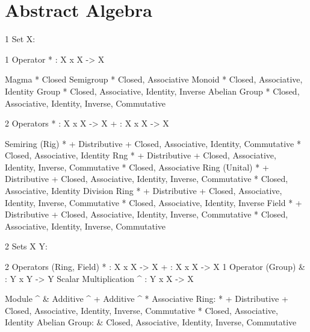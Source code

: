 \part{Abstract Algebra}\label{part:abstract_algebra}

\iffalse

1 Set X:

  1 Operator
  * : X x X -> X

    Magma         * Closed
    Semigroup     * Closed, Associative
    Monoid        * Closed, Associative, Identity
    Group         * Closed, Associative, Identity, Inverse
    Abelian Group * Closed, Associative, Identity, Inverse, Commutative

  2 Operators
  * : X x X -> X
  + : X x X -> X

    Semiring (Rig) * + Distributive
                     + Closed, Associative, Identity, Commutative
                     * Closed, Associative, Identity
    Rng            * + Distributive
                     + Closed, Associative, Identity, Inverse, Commutative
                     * Closed, Associative
    Ring (Unital)  * + Distributive
                     + Closed, Associative, Identity, Inverse, Commutative
                     * Closed, Associative, Identity
    Division Ring  * + Distributive
                     + Closed, Associative, Identity, Inverse, Commutative
                     * Closed, Associative, Identity, Inverse
    Field          * + Distributive
                     + Closed, Associative, Identity, Inverse, Commutative
                     * Closed, Associative, Identity, Inverse, Commutative

2 Sets X Y:

  2 Operators (Ring, Field)
  * : X x X -> X
  + : X x X -> X
  1 Operator (Group)
  & : Y x Y -> Y
  Scalar Multiplication
  ^ : Y x X -> X

    Module
                    ^ & Additive
                    ^ + Additive
                    ^ * Associative
              Ring: * + Distributive
                      + Closed, Associative, Identity, Inverse, Commutative
                      * Closed, Associative, Identity
            Abelian
             Group:   & Closed, Associative, Identity, Inverse, Commutative

